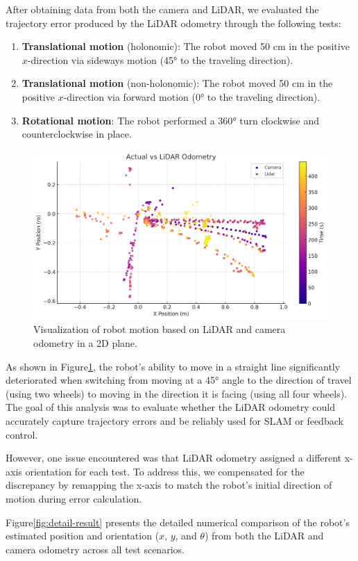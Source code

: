 \newpage
After obtaining data from both the camera and LiDAR, we evaluated the trajectory error produced by the LiDAR odometry through the following tests:

\begin{enumerate}
    \item \textbf{Translational motion} (holonomic): The robot moved 50 cm in the positive \(x\)-direction via sideways motion (45° to the traveling direction).
    \item \textbf{Translational motion} (non-holonomic): The robot moved 50 cm in the positive \(x\)-direction via forward motion (0° to the traveling direction).
    \item \textbf{Rotational motion}: The robot performed a 360° turn clockwise and counterclockwise in place.
\end{enumerate}


\begin{figure}[H]
    \centering
    \includegraphics[width=0.7\linewidth]{assets/images/odometry/testing_visual.png}
    \caption{Visualization of robot motion based on LiDAR and camera odometry in a 2D plane.}
    \label{fig:visual-result}
\end{figure}

As shown in Figure\ref{fig:visual-result}, the robot’s ability to move in a straight line significantly deteriorated when switching from moving at a 45° angle to the direction of travel (using two wheels) to moving in the direction it is facing (using all four wheels). The goal of this analysis was to evaluate whether the LiDAR odometry could accurately capture trajectory errors and be reliably used for SLAM or feedback control.

However, one issue encountered was that LiDAR odometry assigned a different x-axis orientation for each test. To address this, we compensated for the discrepancy by remapping the x-axis to match the robot’s initial direction of motion during error calculation.

Figure\ref{fig:detail-result} presents the detailed numerical comparison of the robot's estimated position and orientation ($x$, $y$, and $\theta$) from both the LiDAR and camera odometry across all test scenarios.


